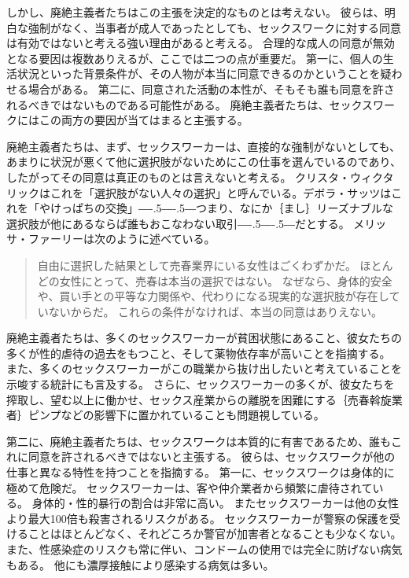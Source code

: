 \documentclass[paper=a4,book,openany]{jlreq}
\def\DDASH{―\kern-.5\zw―\kern-.5\zw―} %
\begin{document}
しかし、廃絶主義者たちはこの主張を決定的なものとは考えない。
彼らは、明白な強制がなく、当事者が成人であったとしても、セックスワークに対する同意は有効ではないと考える強い理由があると考える。
合理的な成人の同意が無効となる要因は複数ありえるが、ここでは二つの点が重要だ。
第一に、個人の生活状況といった背景条件が、その人物が本当に同意できるのかということを疑わせる場合がある。
第二に、同意された活動の本性が、そもそも誰も同意を許されるべきではないものである可能性がある。
廃絶主義者たちは、セックスワークにはこの両方の要因が当てはまると主張する。

廃絶主義者たちは、まず、セックスワーカーは、直接的な強制がないとしても、あまりに状況が悪くて他に選択肢がないためにこの仕事を選んでいるのであり、したがってその同意は真正のものとは言えないと考える。
クリスタ・ウィクタリックはこれを「選択肢がない人々の選択」と呼んでいる\citep[p.63]{wichterich00:_global_woman}。デボラ・サッツはこれを「やけっぱちの交換」{\DDASH}つまり、なにか｛まし｝{リーズナブル}な選択肢が他にあるならば誰もおこなわない取引{\DDASH}だとする\citep[p.71]{satz95:_market_women_sexual_labor}。
メリッサ・ファーリーは次のように述べている。

\begin{quote}
自由に選択した結果として売春業界にいる女性はごくわずかだ。
ほとんどの女性にとって、売春は本当の選択ではない。
なぜなら、身体的安全や、買い手との平等な力関係や、代わりになる現実的な選択肢が存在していないからだ。
これらの条件がなければ、本当の同意はありえない。
\citep{farley13:_prost_liber_slaver}
\end{quote}

廃絶主義者たちは、多くのセックスワーカーが貧困状態にあること、彼女たちの多くが性的虐待の過去をもつこと、そして薬物依存率が高いことを指摘する。
また、多くのセックスワーカーがこの職業から抜け出したいと考えていることを示唆する統計にも言及する。
さらに、セックスワーカーの多くが、彼女たちを搾取し、望む以上に働かせ、セックス産業からの離脱を困難にする｛売春斡旋業者｝{ピンプ}などの影響下に置かれていることも問題視している。

第二に、廃絶主義者たちは、セックスワークは本質的に有害であるため、誰もこれに同意を許されるべきではないと主張する。
彼らは、セックスワークが他の仕事と異なる特性を持つことを指摘する。
第一に、セックスワークは身体的に極めて危険だ。
セックスワーカーは、客や仲介業者から頻繁に虐待されている。
身体的・性的暴行の割合は非常に高い。
またセックスワーカーは他の女性より最大100倍も殺害されるリスクがある\citep{salfati08:_prost_homic}。
セックスワーカーが警察の保護を受けることはほとんどなく、それどころか警官が加害者となることも少なくない。
また、性感染症のリスクも常に伴い、コンドームの使用では完全に防げない病気もある。
他にも濃厚接触により感染する病気は多い。
\end{document}
